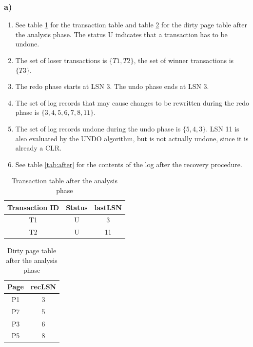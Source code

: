 \documentclass[12pt,a4paper,fleqn]{article}
\begin{document}
\subsubsection*{a)}
\begin{enumerate}
  \item See table \ref{tab:transactions} for the transaction table and table \ref{tab:dirty} for the dirty page table after the analysis phase. The status U indicates that a transaction has to be undone.
  \item The set of loser transactions is $\{T1, T2\}$, the set of winner transactions is $\{T3\}$.
  \item The redo phase starts at LSN 3. The undo phase ends at LSN 3.
  \item The set of log records that may cause changes to be rewritten during the redo phase is $\{3,4,5,6,7,8,11\}$.
  \item The set of log records undone during the undo phase is $\{5,4,3\}$. LSN 11 is also evaluated by the UNDO algorithm, but is not actually undone, since it is already a CLR.
  \item See table \ref{tab:after} for the contents of the log after the recovery procedure.
\end{enumerate}

\begin{table}
  \centering
  \begin{tabular}{c | c | c}
  Transaction ID & Status & lastLSN \\ \hline
  T1 & U & 3\\
  T2 & U & 11
  \end{tabular}
  \caption{Transaction table after the analysis phase}
  \label{tab:transactions}
\end{table}

\begin{table}
  \centering
  \begin{tabular}{c|c}
  Page & recLSN \\ \hline
  P1 & 3 \\
  P7 & 5 \\
  P3 & 6 \\
  P5 & 8 
  \end{tabular}
  \caption{Dirty page table after the analysis phase}
  \label{tab:dirty}
\end{table}
\end{document}
